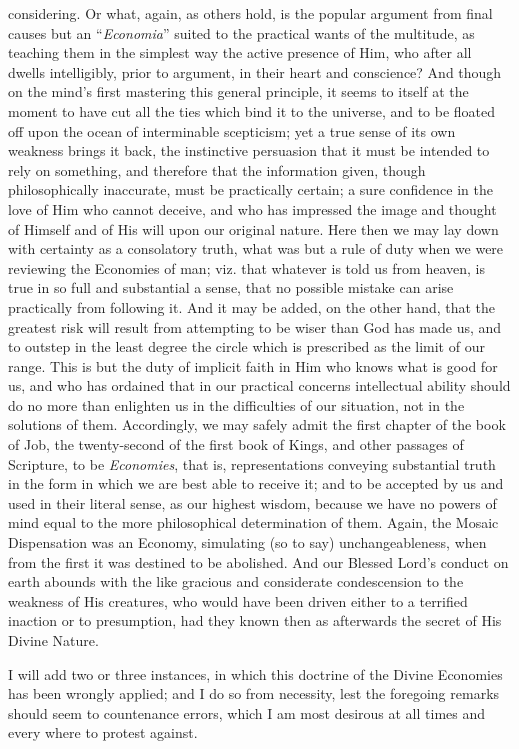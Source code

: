 considering. Or what, again, as others hold, is the popular
argument from final causes but an ``\emph{Economia}'' suited
to the practical wants of the multitude, as teaching them in the
simplest way the active presence of Him, who after all dwells
intelligibly, prior to argument, in their heart and conscience? And
though on the mind's first mastering this general principle, it seems
to itself at the moment to have cut all the ties which bind it to the
universe, and to be floated off upon the ocean of interminable
scepticism; yet a true sense of its own weakness brings it back, the
instinctive persuasion that it must be intended to rely on something,
and therefore that the information given, though philosophically
inaccurate, must be practically certain; a sure confidence in the love
of Him who cannot deceive, and who has impressed the image and thought
of Himself and of His will upon our original nature. Here then we may
lay down with certainty as a consolatory truth, what was but a rule of
duty when we were reviewing the Economies of man; viz. that whatever
is told us from heaven, is true in so full and substantial a sense,
that no possible mistake can arise practically from following it. And
it may be added, on the other hand, that the greatest risk will result
from attempting to be wiser than God has made us, and to outstep in
the least degree the circle which is prescribed as the limit of our
range. This is but the duty of implicit faith in Him who knows what is
good for us, and who has ordained that in our practical concerns
intellectual ability should do no more than enlighten us in the
difficulties of our situation, not in the solutions of them.
Accordingly, we may safely admit the first chapter of the book of Job,
the twenty-second of the first book of Kings, and other passages
of Scripture, to be \emph{Economies}, that is, representations conveying
substantial truth in the form in which we are best able to receive it;
and to be accepted by us and used in their literal sense, as our
highest wisdom, because we have no powers of mind equal to the more
philosophical determination of them. Again, the Mosaic Dispensation
was an Economy, simulating (so to say) unchangeableness, when from the
first it was destined to be abolished. And our Blessed Lord's conduct
on earth abounds with the like gracious and considerate condescension
to the weakness of His creatures, who would have been driven either to
a terrified inaction or to presumption, had they known then as
afterwards the secret of His Divine Nature.

I will add two or three instances, in which this doctrine of the
Divine Economies has been wrongly applied; and I do so from necessity,
lest the foregoing remarks should seem to countenance errors, which I
am most desirous at all times and every where to protest against.

